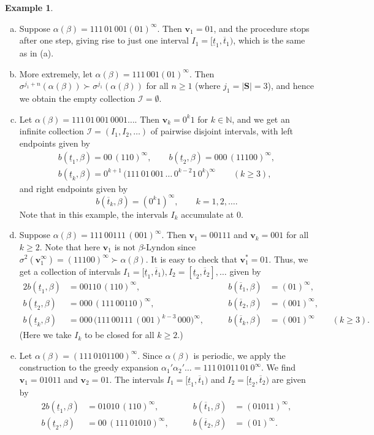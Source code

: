\documentclass[11pt]{amsart}
\theoremstyle{definition}
\newtheorem{example}[theorem]{Example}
\theoremstyle{remark}
\numberwithin{equation}{section}
\newcommand{\N}{\ensuremath{\mathbb{N}}}
\newcommand{\II}{\mathcal{I}}
\newcommand{\cs}{ {\mathbf{S}}}
\renewcommand{\v}{\mathbf{v}}
\newcommand{\f}{\infty}
\newcommand{\al}{\alpha}
\newcommand{\si}{\sigma}
\begin{document}
\begin{example}
\begin{enumerate}[(a)]
\item Suppose $\al(\beta)=111\,01\,001(01)^\f$. Then $\v_1=01$, and the procedure stops after one step, giving rise to just one interval $I_1=[\underline{t}_1,\overline{t}_1)$, which is the same as in (a).
\item More extremely, let $\al(\beta)=111\,001(01)^\f$. Then $\si^{j_1+n}(\al(\beta))\succ \si^{j_1}(\al(\beta))$ for all $n\geq 1$ (where $j_1=|\cs|=3$), and hence we obtain the empty collection $\II=\emptyset$.
\item Let $\al(\beta)=111\,01\,001\,0001\dots$. Then $\v_k=0^k1$ for $k\in\N$, and we get an infinite collection $\mathcal{I}=(I_1,I_2,\dots)$ of pairwise disjoint intervals, with left endpoints given by
\begin{gather*}
b(\underline{t}_1,\beta)=00\,(110)^\f, \qquad b(\underline{t}_2,\beta)=000\,(11100)^\f,\\
b(\underline{t}_k,\beta)=0^{k+1}\,\big(111\,01\,001\,\dots\,0^{k-2}1\,0^k\big)^\f \qquad (k\geq 3),
\end{gather*}
and right endpoints given by
\[
b(\overline{t}_k,\beta)=(0^k1)^\f, \qquad k=1,2,\dots.
\]
Note that in this example, the intervals $I_k$ accumulate at $0$.
\item Suppose $\al(\beta)=111\,00111\,(001)^\f$. Then $\v_1=00111$ and $\v_k=001$ for all $k\geq 2$. Note that here $\v_1$ is not $\beta$-Lyndon since $\si^2(\v_1^\f)=(11100)^\f\succ\al(\beta)$. It is easy to check that $\v_1^*=01$. Thus, we get a collection of intervals $I_1=[\underline{t}_1,\overline{t}_1), I_2=[\underline{t}_2,\overline{t}_2],\dots$ given by
\begin{alignat*}{2}
b(\underline{t}_1,\beta)&=00110\,(110)^\f, & \qquad b(\overline{t}_1,\beta)&=(01)^\f,\\
b(\underline{t}_2,\beta)&=000\,(111\,00110)^\f, & \qquad b(\overline{t}_2,\beta)&=(001)^\f,\\
b(\underline{t}_k,\beta)&=000\,\big(111\,00111\,(001)^{k-3}\,000\big)^\f, & \qquad b(\overline{t}_k,\beta)&=(001)^\f \qquad (k\geq 3).
\end{alignat*}
{(Here we take $I_k$ to be closed for all $k\geq 2$.)}

\item Let $\al(\beta)=(111\,0101100)^\f$. Since $\al(\beta)$ is periodic, we apply the construction to the greedy expansion $\al_1'\al_2'\dots=111\,01011\,01\,0^\f$. We find $\v_1=01011$ and $\v_2=01$. The intervals $I_1=[\underline{t}_1,\overline{t}_1)$ and $I_2=[\underline{t}_2,\overline{t}_2)$ are given by
\begin{alignat*}{2}
b(\underline{t}_1,\beta)&=01010\,(110)^\f, & \qquad b(\overline{t}_1,\beta)&=(01011)^\f,\\
b(\underline{t}_2,\beta)&=00\,(111\,01010)^\f, & \qquad b(\overline{t}_2,\beta)&=(01)^\f.
\end{alignat*}
\end{enumerate}
\end{example}
\end{document}
